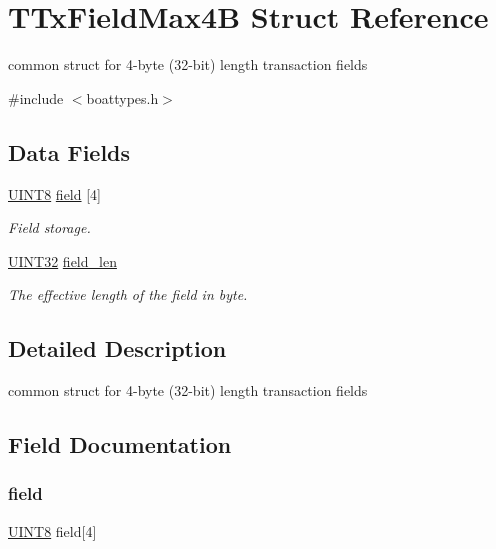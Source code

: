 \hypertarget{struct_t_tx_field_max4_b}{}\section{T\+Tx\+Field\+Max4B Struct Reference}
\label{struct_t_tx_field_max4_b}


common struct for 4-\/byte (32-\/bit) length transaction fields  




{\ttfamily \#include $<$boattypes.\+h$>$}

\subsection*{Data Fields}
\begin{DoxyCompactItemize}
\item 
\mbox{\hyperlink{boattypes_8h_ab27e9918b538ce9d8ca692479b375b6a}{U\+I\+N\+T8}} \mbox{\hyperlink{struct_t_tx_field_max4_b_a65cfc324487c18695a24f5e2636f03c6}{field}} \mbox{[}4\mbox{]}
\begin{DoxyCompactList}\small\item\em Field storage. \end{DoxyCompactList}\item 
\mbox{\hyperlink{boattypes_8h_ae1e6edbbc26d6fbc71a90190d0266018}{U\+I\+N\+T32}} \mbox{\hyperlink{struct_t_tx_field_max4_b_a37f1b9ab89b19244af4f685f3b6e384a}{field\+\_\+len}}
\begin{DoxyCompactList}\small\item\em The effective length of the field in byte. \end{DoxyCompactList}\end{DoxyCompactItemize}


\subsection{Detailed Description}
common struct for 4-\/byte (32-\/bit) length transaction fields 

\subsection{Field Documentation}
\mbox{\label{struct_t_tx_field_max4_b_a65cfc324487c18695a24f5e2636f03c6}} 
\subsubsection{\texorpdfstring{field}{field}}
{\footnotesize\ttfamily \mbox{\hyperlink{boattypes_8h_ab27e9918b538ce9d8ca692479b375b6a}{U\+I\+N\+T8}} field\mbox{[}4\mbox{]}}




